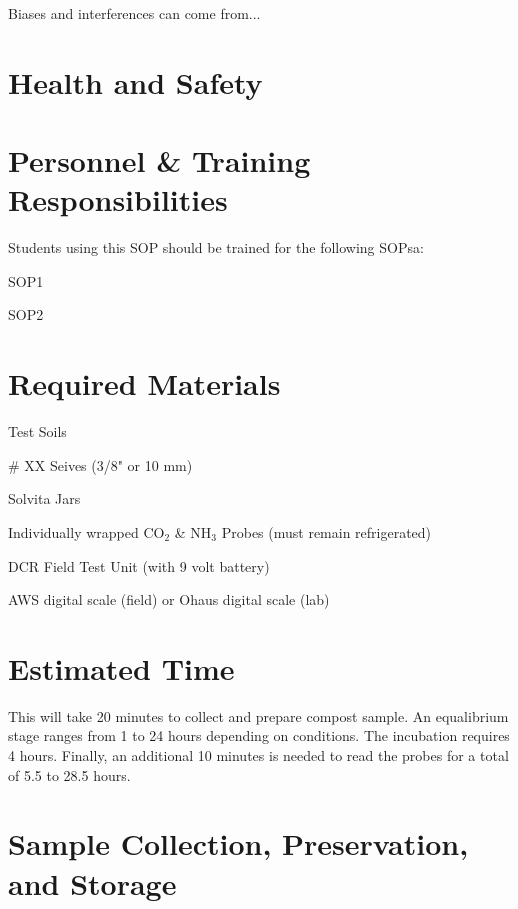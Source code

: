 \documentclass[12pt]{../SOP4_alpha}\usepackage[]{graphicx}\usepackage[]{xcolor}
\begin{document}
\NP Biases and interferences can come from...



\section{Health and Safety}



\section{Personnel \& Training Responsibilities}


Students using this SOP should be trained for the following SOPsa:

\begin{itemize*}
  \item SOP1
  \item SOP2
\end{itemize*}

\section{Required Materials}

\begin{itemize*}
  \item Test Soils
  \item \# XX Seives (3/8" or 10 mm)
  \item Solvita Jars
  \item Individually wrapped CO$_2$ \& NH$_3$ Probes (must remain refrigerated) 
  \item DCR Field Test Unit (with 9 volt battery)
  \item AWS digital scale (field) or Ohaus digital scale (lab)
\end{itemize*}

\section{Estimated Time}

\NP This will take 20 minutes to collect and prepare compost sample. An equalibrium stage ranges from 1 to 24 hours depending on conditions. The incubation requires 4 hours. Finally, an additional 10 minutes is needed to read the probes for a total of 5.5 to 28.5 hours.

\section{Sample Collection, Preservation, and Storage}
\end{document}
